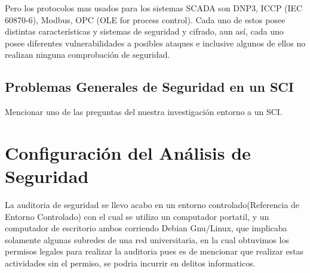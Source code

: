\documentclass[jou,apacite]{apa6}   %
\begin{document}
Pero los protocolos mas usados para los sistemas SCADA son DNP3, ICCP (IEC 60870-6), Modbus, OPC (OLE for process control). Cada uno de estos posee distintas características y sistemas de seguridad y cifrado, aun así, cada uno posee diferentes vulnerabilidades a posibles ataques e inclusive algunos de ellos no realizan ninguna comprobación de seguridad.

\subsection{Problemas Generales de Seguridad en un SCI }
Mencionar uno de las preguntas del nuestra investigación entorno a un SCI.

\section{Configuración del Análisis de Seguridad}
La auditoria de seguridad se llevo acabo en un entorno controlado(Referencia de Entorno Controlado) con el cual se utilizo un computador portatil, y un computador de escritorio ambos corriendo Debian Gnu/Linux, 
que implicaba solamente algunas subredes de una red universitaria, en la cual obtuvimos los permisos legales para realizar la auditoria pues es de mencionar que realizar estas actividades sin el permiso, se podria incurrir en delitos informaticos. 
\end{document}
